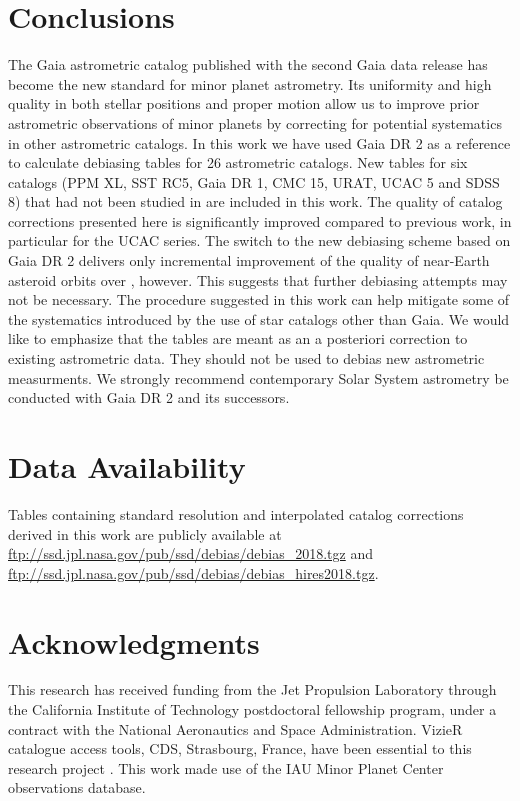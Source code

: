 \documentclass[review]{elsarticle}
\begin{document}
\section{Conclusions}
\label{sec:conclusions}
The Gaia astrometric catalog published with the second Gaia data release has become the new standard for minor planet astrometry. 
Its uniformity and high quality in both stellar positions and proper motion allow us to improve prior astrometric observations of minor planets by correcting for potential systematics in other astrometric catalogs. 
In this work we have used Gaia DR 2 as a reference to calculate debiasing tables for 26 astrometric catalogs. New tables for six catalogs (PPM XL, SST RC5, Gaia DR 1, CMC 15, URAT, UCAC 5 and SDSS 8) that had not been studied in \citet{farnocchia15} are included in this work.
The quality of catalog corrections presented here is significantly improved compared to previous work, in particular for the UCAC series.  
The switch to the new debiasing scheme based on Gaia DR 2 delivers only incremental improvement of the quality of near-Earth asteroid orbits over \citet{farnocchia15}, however.
This suggests that further debiasing attempts may not be necessary. 
The procedure suggested in this work can help mitigate some of the systematics introduced by the use of star catalogs other than Gaia. We would like to emphasize that 
the tables are meant as an a posteriori correction to existing astrometric data. They should not be used to debias new astrometric measurments.
We strongly recommend contemporary Solar System astrometry be conducted with Gaia DR 2 and its successors. 

\section{Data Availability}
Tables containing standard resolution and interpolated catalog corrections derived in this work are publicly available at \url{ftp://ssd.jpl.nasa.gov/pub/ssd/debias/debias_2018.tgz}
and 
\url{ftp://ssd.jpl.nasa.gov/pub/ssd/debias/debias_hires2018.tgz}.

\section*{Acknowledgments}
 This research has received funding from the Jet Propulsion Laboratory through the California Institute of Technology postdoctoral fellowship program, under a contract with the National Aeronautics and Space Administration.
 VizieR catalogue access tools, CDS, Strasbourg, France, have been essential to this research project \citep{vizier}.
 This work made use of the IAU Minor Planet Center observations database.
\end{document}
